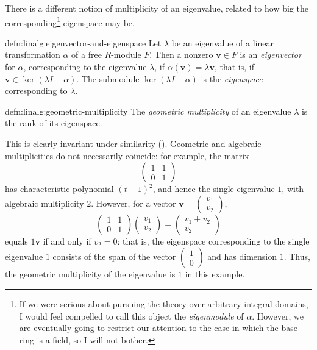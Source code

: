 There is a different notion of multiplicity of an eigenvalue, related
to how big the corresponding\footnote{If we were serious about
  pursuing the theory over arbitrary integral domains, I would feel
  compelled to call this object the \emph{eigenmodule} of $\alpha$.
  However, we are eventually going to restrict our attention to the
  case in which the base ring is a field, so I will not bother.}
eigenspace may be.
\begin{defn}{}{defn:linalg:eigenvector-and-eigenspace}
  Let $\lambda$ be an eigenvalue of a linear transformation $\alpha$
  of a free $R$-module $F$. Then a nonzero $\mathbf{v} \in F$ is an
  \emph{eigenvector} for $\alpha$, corresponding to the eigenvalue
  $\lambda$, if $\alpha(\mathbf{v}) = \lambda\mathbf{v}$, that is, if
  $\mathbf{v} \in \ker(\lambda I - \alpha)$. The submodule
  $\ker(\lambda I - \alpha)$ is the \emph{eigenspace} corresponding to
  $\lambda$.
\end{defn}
\begin{defn}{}{defn:linalg:geometric-multiplicity}
  The \emph{geometric multiplicity} of an eigenvalue $\lambda$ is the
  rank of its eigenspace.
\end{defn}
This is clearly invariant under similarity
(). Geometric
and algebraic multiplicities do not necessarily coincide: for example,
the matrix
\[
  \begin{pmatrix} 1 & 1 \\ 0 & 1 \end{pmatrix}
\]
has characteristic polynomial $(t-1)^2$, and hence the single
eigenvalue $1$, with algebraic multiplicity $2$. However, for a vector
$\mathbf{v} = \begin{pmatrix} v_1 \\ v_2 \end{pmatrix}$,
\[
  \begin{pmatrix} 1 & 1 \\ 0 & 1 \end{pmatrix}
  \begin{pmatrix} v_1 \\ v_2 \end{pmatrix} =
  \begin{pmatrix} v_1 + v_2 \\ v_2 \end{pmatrix}
\]
equals $1\mathbf{v}$ if and only if $v_2 = 0$: that is, the eigenspace
corresponding to the single eigenvalue $1$ consists of the span of the
vector $\begin{pmatrix} 1 \\ 0 \end{pmatrix}$ and has dimension $1$.
Thus, the geometric multiplicity of the eigenvalue is $1$ in this
example.

